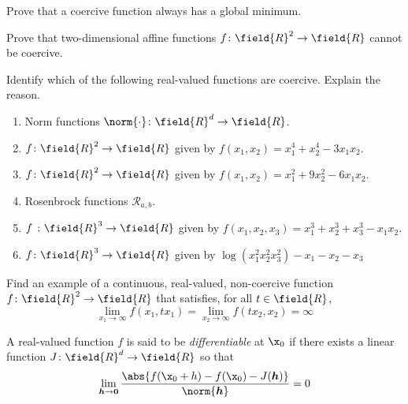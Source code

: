 \begin{problem}\label{problem:CoerciveFunctions}
Prove that a coercive function always has a global minimum.
\end{problem}

\begin{problem}
Prove that two-dimensional affine functions $f\colon \field{R}^2 \to \field{R}$ cannot be coercive.
\end{problem}

\begin{problem}
Identify which of the following real-valued functions are coercive.  Explain the reason.
\begin{enumerate}
	\item Norm functions $\norm{\cdot} \colon \field{R}^d \to \field{R}$.
	\item $f\colon \field{R}^2 \to \field{R}$ given by $f(x_1,x_2) = x_1^4 + x_2^4 - 3x_1x_2$.
	\item $f\colon \field{R}^2 \to \field{R}$ given by $f(x_1,x_2) = x_1^2 + 9x_2^2 - 6x_1x_2$.
	\item Rosenbrock functions $\mathcal{R}_{a,b}$.
	\item $f\ \colon \field{R}^3 \to \field{R}$ given by $f(x_1,x_2,x_3) = x_1^3 + x_2^3 + x_3^3 -x_1x_2$.
	\item $f \colon \field{R}^3 \to \field{R}$ given by $\log(x_1^2 x_2^2 x_3^2) - x_1 - x_2 -x _3$
\end{enumerate}
\end{problem}

\begin{problem}
Find an example of a continuous, real-valued, non-coercive function $f\colon \field{R}^2 \to \field{R}$ that satisfies, for all $t \in \field{R}$,
\begin{equation*}
\lim_{x_1 \to \infty} f(x_1, tx_1) = \lim_{x_2 \to \infty} f(tx_2, x_2) = \infty
\end{equation*}
\end{problem}

A real-valued function $f$ is said to be \emph{differentiable} at $\x_0$ if there exists a linear function $J\colon \field{R}^d \to \field{R}$ so that 
\begin{equation*}
\lim_{\boldsymbol{h} \to \boldsymbol{0}} \frac{\abs{f(\x_0+h)-f(\x_0)-J(\boldsymbol{h})}}{\norm{\boldsymbol{h}}} = 0
\end{equation*}

